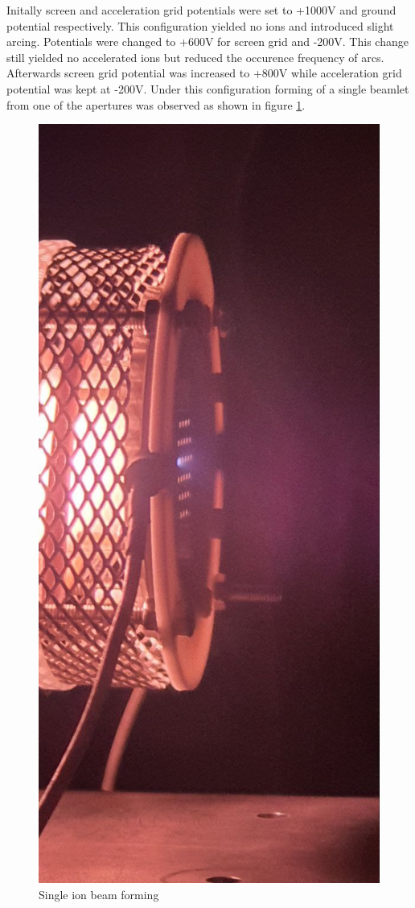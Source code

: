 Initally screen and acceleration grid potentials were set to +1000V and ground potential respectively. This configuration yielded no ions and introduced slight arcing. Potentials were changed to +600V for screen grid and -200V. This change still yielded no accelerated ions but reduced the occurence frequency of arcs. Afterwards screen grid potential was increased to +800V while acceleration grid potential was kept at -200V. Under this configuration forming of a single beamlet from one of the apertures was observed as shown in 
figure \ref{fig:4th_single}.
\begin{figure}[ht]
    \centering
    \includegraphics[scale=0.4]{fig/deneme4/test4_singlebeam.jpeg}
    \caption{Single ion beam forming}
    \label{fig:4th_single}
\end{figure}

